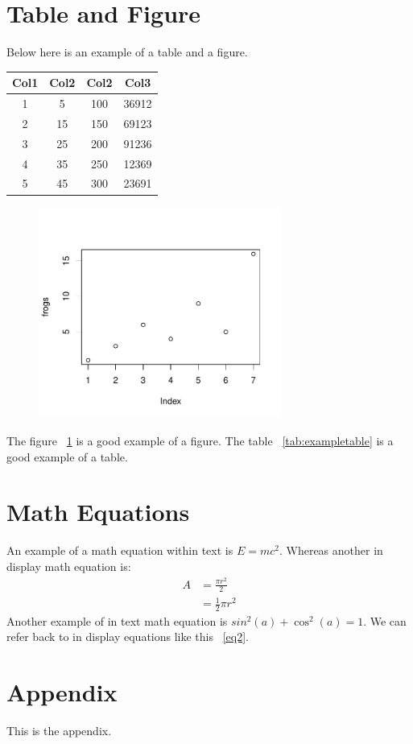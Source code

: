\documentclass[12pt, letterpaper]{article}
\begin{document}
\section{Table and Figure}
\label{sec:dependence}

Below here is an example of a table and a figure. 
\lipsum[1]

\begin{center}
\label{tab:exampletable}
\begin{tabular}{||c c c c||} 
 \hline
 Col1 & Col2 & Col2 & Col3 \\ [0.5ex] 
 \hline\hline
 1 & 5 & 100 & 36912 \\ 
 \hline
 2 & 15 & 150 & 69123 \\
 \hline
 3 & 25 & 200 & 91236 \\
 \hline
 4 & 35 & 250 & 12369 \\
 \hline
 5 & 45 & 300 & 23691 \\ [1ex] 
 \hline
\end{tabular}
\end{center}

\begin{figure}[tbp]
\label{fig:examplefig}
\includegraphics[width=8cm]{examplefigfrog.pdf}
\centering
\end{figure}

The figure ~\ref{fig:examplefig} is a good example of a figure. 
\lipsum[1]
The table ~\ref{tab:exampletable} is a good example of a table. 


\section{Math Equations}
\label{sec:fittedwithdependence}

An example of a math equation within text is \(E=mc^2\). Whereas another in display math equation is:
\begin{equation} \label{eq2}
	\begin{split}
	A & = \frac{\pi r^2}{2} \\
	 & = \frac{1}{2} \pi r^2
\end{split}
\end{equation}
Another example of in text math equation is \(sin^2(a)+\cos^2(a) = 1\). 
\lipsum[1]
We can refer back to in display equations like this ~\eqref{eq2}.

\appendix

\section{Appendix}
\label{sec:appendix}

This is the appendix.
\lipsum[1]



\end{document}
